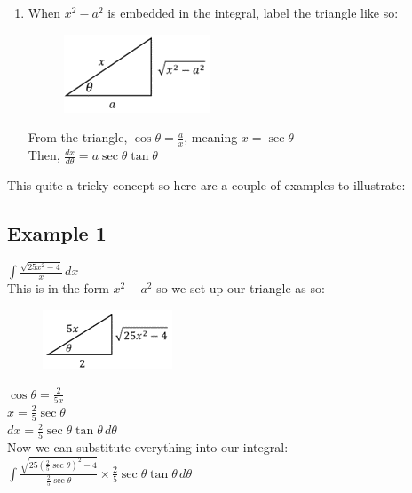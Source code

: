 \documentclass[../main.tex]{subfiles}
\begin{document}
\begin{enumerate}
    \item 
    When \(x^2-a^2\) is embedded in the integral, label the triangle like so:\\
    \begin{figure}[h]
        \centering
        \includegraphics{images/trigsub3.png}
    \end{figure}

    From the triangle, \(\cos{\theta}=\frac{a}{x}\), meaning \(x=\sec{\theta}\)\\
    Then, \(\frac{dx}{d\theta}=a\sec{\theta}\tan{\theta}\)
      
    \end{enumerate}
    This quite a tricky concept so here are a couple of examples to illustrate:\\

    \subsection*{Example 1}
    \(\int \frac{\sqrt{25x^2-4}}{x}\,dx\)\\

    This is in the form \(x^2-a^2\) so we set up our triangle as so:\\
    \begin{figure}[h]
        \centering
        \includegraphics{images/trigsub4.png}
    \end{figure}

    \(\cos{\theta}=\frac{2}{5x}\)\\
    \(x=\frac{2}{5}\sec{\theta}\)\\
    \(dx=\frac{2}{5}\sec{\theta}\tan{\theta}\,d\theta\)\\

    Now we can substitute everything into our integral:\\
    \(\int \frac{\sqrt{25(\frac{2}{5}\sec{\theta})^2-4}}{\frac{2}{5}\sec{\theta}}\times \frac{2}{5}\sec{\theta}\tan{\theta}\,d\theta\)\\
\end{document}
